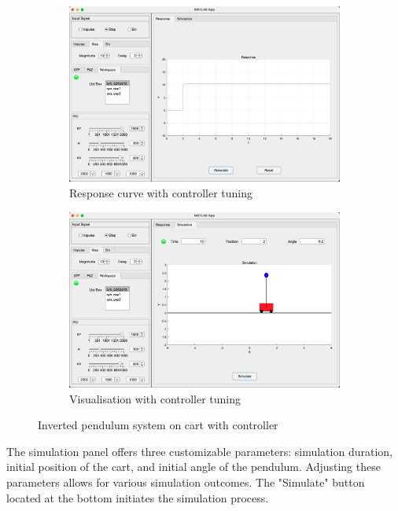 \documentclass[journal,twoside,web]{ieeecolor}
\begin{document}
\begin{figure}[!ht]
    \centering
    \begin{subfigure}[b]{0.5\textwidth}
        \centering
        \includegraphics[width=\textwidth]{Images/PIDresult.jpg}
        \caption{Response curve with controller tuning}
        \label{fig:PIDresult}
    \end{subfigure}%
    \hfill %
    \begin{subfigure}[b]{0.5\textwidth}
        \centering
        \includegraphics[width=\textwidth]{Images/PID siim.jpg}
        \caption{Visualisation with controller tuning}
        \label{fig:PIDsiim}
    \end{subfigure}
    \caption{Inverted pendulum system on cart with controller}
    \label{fig:123}
\end{figure}

The simulation panel offers three customizable parameters: simulation duration, initial position of the cart, and initial angle of the pendulum. Adjusting these parameters allows for various simulation outcomes. The "Simulate" button located at the bottom initiates the simulation process.
\end{document}
